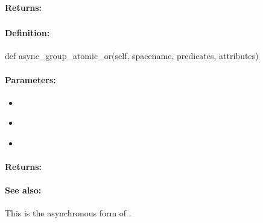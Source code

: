 \paragraph{Returns:}


\pagebreak
\subsubsection{}
\label{api:python:async_group_atomic_or}


\paragraph{Definition:}
\begin{pythoncode}
def async_group_atomic_or(self, spacename, predicates, attributes)
\end{pythoncode}

\paragraph{Parameters:}
\begin{itemize}[noitemsep]
\item {}\\

\item {}\\

\item {}\\

\end{itemize}

\paragraph{Returns:}


\paragraph{See also:}  This is the asynchronous form of .

\pagebreak
\subsubsection{}
\label{api:python:atomic_xor}


